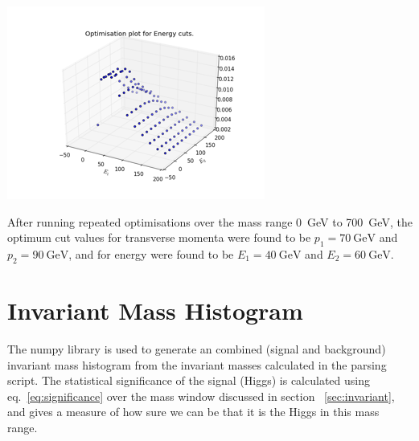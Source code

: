 \documentclass[11pt]{amsart}
\makeatletter
\newenvironment{figurehere}
  {\def\@captype{figure}}
  {}
\makeatother
\begin{document}
\begin{multicols}{2}
\begin{figurehere}
  \centering
  \includegraphics[width=\linewidth]{energy}
  \label{fig:energy}
\end{figurehere}

After running repeated optimisations over the mass range \SI{0}{\giga\electronvolt} to \SI{700}{\giga\electronvolt}, the optimum cut values for transverse momenta were found to be $p_1 = \SI{70}{\giga\electronvolt}$ and $p_2 = \SI{90}{\giga\electronvolt}$, and for energy were found to be $E_1 = \SI{40}{\giga\electronvolt}$ and $E_2 = \SI{60}{\giga\electronvolt}$.

\section{Invariant Mass Histogram}

The numpy library is used to generate an combined (signal and background) invariant mass histogram from the invariant masses calculated in the parsing script. The statistical significance of the signal (Higgs) is calculated using eq.~\ref{eq:significance} over the mass window discussed in section ~\ref{sec:invariant}, and gives a measure of how sure we can be that it is the Higgs in this mass range.


\end{multicols}
\end{document}
